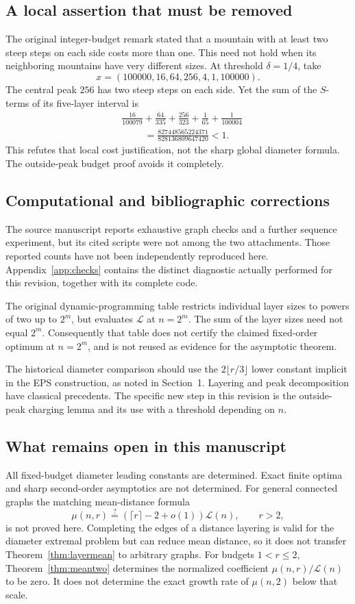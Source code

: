 \documentclass[11pt]{amsart}
\theoremstyle{definition}
\theoremstyle{remark}
\newcommand{\Lz}{\mathcal{L}}
\begin{document}
\subsection*{A local assertion that must be removed}
The original integer-budget remark stated that a mountain with at least
two steep steps on each side costs more than one. This need not hold
when its neighboring mountains have very different sizes. At threshold
$\delta=1/4$, take
\[
 x=(100000,16,64,256,4,1,100000).
\]
The central peak $256$ has two steep steps on each side. Yet the sum of
the $S$-terms of its five-layer interval is
\begin{align*}
 &\frac{16}{100079}+\frac{64}{335}+\frac{256}{323}
       +\frac1{65}+\frac1{100004}\\
 &\hspace{1cm}=\frac{827448565224371}{828136809647420}<1.
\end{align*}
This refutes that local cost justification, not the sharp global
diameter formula. The outside-peak budget proof avoids it completely.

\subsection*{Computational and bibliographic corrections}
The source manuscript reports exhaustive graph checks and a further
sequence experiment, but its cited scripts were not among the two
attachments. Those reported counts have not been independently reproduced
here. Appendix~\ref{app:checks} contains the distinct diagnostic actually
performed for this revision, together with its complete code.

The original dynamic-programming table restricts individual layer sizes
to powers of two up to $2^m$, but evaluates $\Lz$ at $n=2^m$.
The sum of the layer sizes need not equal $2^m$. Consequently that table
does not certify the claimed fixed-order optimum at $n=2^m$, and is not
reused as evidence for the asymptotic theorem.

The historical diameter comparison should use the $2\lfloor r/3\rfloor$
lower constant implicit in the EPS construction, as noted in Section~1.
Layering and peak decomposition have classical precedents. The specific
new step in this revision is the outside-peak charging lemma and its use
with a threshold depending on $n$.

\subsection*{What remains open in this manuscript}
All fixed-budget diameter leading constants are determined. Exact finite
optima and sharp second-order asymptotics are not determined. For general
connected graphs the matching mean-distance formula
\[
 \mu(n,r)\stackrel{?}{=}(\lceil r\rceil-2+o(1))\Lz(n),\qquad r>2,
\]
is not proved here. Completing the edges of a distance layering is valid
for the diameter extremal problem but can reduce mean distance, so it
does not transfer Theorem~\ref{thm:layermean} to arbitrary graphs.
For budgets $1<r\le2$, Theorem~\ref{thm:meantwo} determines the normalized
coefficient $\mu(n,r)/\Lz(n)$ to be zero. It does not determine the exact
growth rate of $\mu(n,2)$ below that scale.
\end{document}
